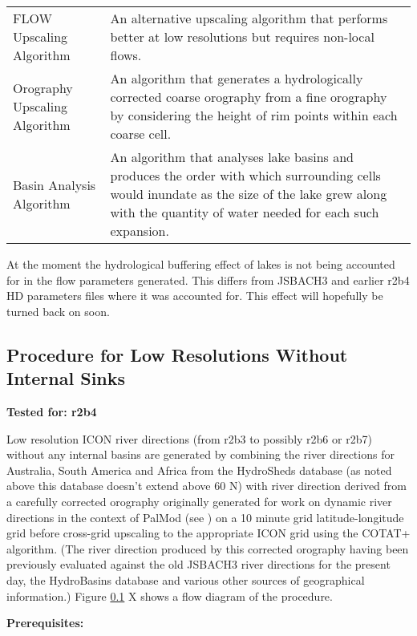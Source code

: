 \documentclass{article}
\begin{document}
{\begin{center}
\begin{longtable} { | l | p{8cm} |}
FLOW Upscaling Algorithm & An alternative upscaling algorithm that performs better at low resolutions but requires non-local flows.\\
Orography Upscaling Algorithm &An algorithm that generates a hydrologically corrected coarse orography from a fine orography by considering the height of rim points within each coarse cell. \\
Basin Analysis Algorithm & An algorithm that analyses lake basins and produces the order with which surrounding cells would inundate as the size of the lake grew along with the quantity of water needed for each such expansion. \\
\hline
\end{longtable}
\label{table-tools-descs}
\end{center}}

At the moment the hydrological buffering effect of lakes is not being accounted for in the flow parameters generated. This differs from JSBACH3 and earlier r2b4 HD parameters files where it was accounted for. This effect will hopefully be turned back on soon.

\subsection{Procedure for Low Resolutions Without Internal Sinks}
\noindent\textbf{Tested for: r2b4}

Low resolution ICON river directions (from r2b3 to possibly r2b6 or r2b7) without any internal basins are generated by combining the river directions for Australia, South America and Africa from the HydroSheds database (as noted above this database doesn't extend above 60 \degree N) with river direction derived from a carefully corrected orography originally generated for work on dynamic river directions in the context of PalMod (see \cite{gmd-11-4291-2018}) on a 10 minute grid latitude-longitude grid before cross-grid upscaling to the appropriate ICON grid using the COTAT+ algorithm. (The river direction produced by this corrected orography having been previously evaluated against the old JSBACH3 river directions for the present day, the HydroBasins database and various other sources of geographical information.) Figure \ref{} X shows a flow diagram of the procedure. \newline

\noindent\textbf{Prerequisites:}
\end{document}
